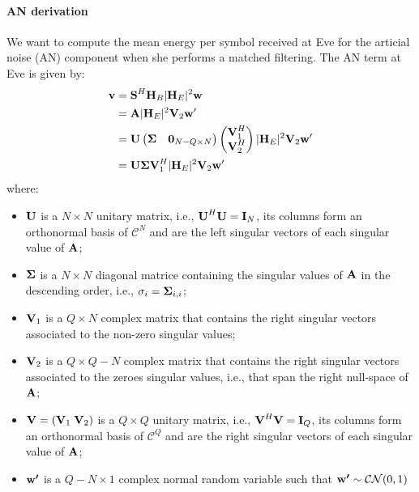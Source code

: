 \documentclass[12pt]{article}
\begin{document}
\paragraph*{AN derivation}
We want to compute the mean energy per symbol received at Eve for the articial noise (AN) component when she performs a matched filtering. The AN term at Eve is given by:
\begin{align}
	\boldsymbol{\mathrm{v}}&=	\boldsymbol{\mathrm{S}}^H \boldsymbol{\mathrm{H}}_B |\boldsymbol{\mathrm{H}}_E|^2 \boldsymbol{\mathrm{w}}\\
	&=\boldsymbol{\mathrm{A}} |\boldsymbol{\mathrm{H}}_E|^2 \boldsymbol{\mathrm{V}}_2 \boldsymbol{\mathrm{w}}'\\
	&= \boldsymbol{\mathrm{U}} \begin{pmatrix}
	\boldsymbol{\mathrm{\Sigma}} & \boldsymbol{\mathrm{0}}_{N-Q\times N}
	\end{pmatrix}  \begin{pmatrix}
	\boldsymbol{\mathrm{V}}_1^H\\
	\boldsymbol{\mathrm{V}}_2^H
	\end{pmatrix} |\boldsymbol{\mathrm{H}}_E|^2 \boldsymbol{\mathrm{V}}_2 \boldsymbol{\mathrm{w}}'\\
	&=\boldsymbol{\mathrm{U}} \boldsymbol{\mathrm{\Sigma}}\boldsymbol{\mathrm{V}}_1^H |\boldsymbol{\mathrm{H}}_E|^2 \boldsymbol{\mathrm{V}}_2 \boldsymbol{\mathrm{w}}'
\end{align}
where:
\begin{itemize}
	\item $\boldsymbol{\mathrm{U}}$ is a $N \times N$ unitary matrix, i.e., $\boldsymbol{\mathrm{U}}^H \boldsymbol{\mathrm{U}} = \boldsymbol{\mathrm{I}}_N$, its columns form an orthonormal basis of $\mathcal{C}^N$ and are the left singular vectors of each singular value of $\boldsymbol{\mathrm{A}}$;
	\item $\boldsymbol{\mathrm{\Sigma}}$ is a $N \times N$ diagonal matrice containing the singular values of $\boldsymbol{\mathrm{A}}$ in the descending order, i.e., $\sigma_i = \boldsymbol{\mathrm{\Sigma}}_{i,i}$;
	\item $\boldsymbol{\mathrm{V}}_1$ is a $Q \times N$ complex matrix that contains the right singular vectors associated to the non-zero singular values;
	\item $\boldsymbol{\mathrm{V}}_2$ is a $Q \times Q-N$ complex matrix that contains the right singular vectors associated to the zeroes singular values, i.e., that span the right null-space of $\boldsymbol{\mathrm{A}}$;
	\item $\boldsymbol{\mathrm{V}} = \left(\boldsymbol{\mathrm{V}}_1 \; \boldsymbol{\mathrm{V}}_2\right)$ is a $Q \times Q$ unitary matrix, i.e., $\boldsymbol{\mathrm{V}}^H \boldsymbol{\mathrm{V}} = \boldsymbol{\mathrm{I}}_Q$, its columns form an orthonormal basis of $\mathcal{C}^Q$ and are the right singular vectors of each singular value of $\boldsymbol{\mathrm{A}}$;
	\item $\boldsymbol{\mathrm{w'}}$ is a $Q-N \times 1$ complex normal random variable such that $\boldsymbol{\mathrm{w'}} \sim \mathcal{CN}(0,1)$
\end{itemize} 
\end{document}
